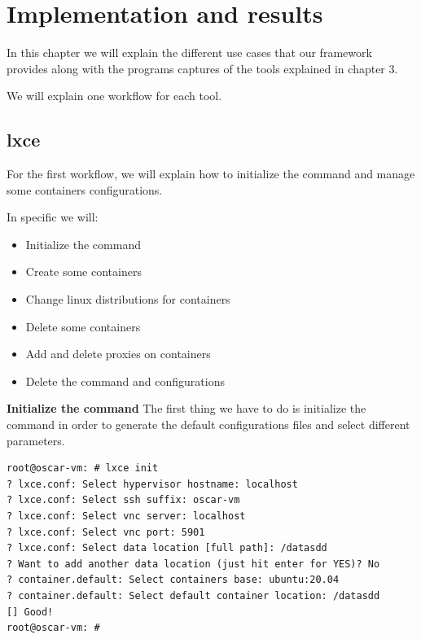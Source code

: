 \clearpage\section{Implementation and results}

In this chapter we will explain the different use cases that our framework provides along with the programs captures of the tools explained in chapter 3.

We will explain one workflow for each tool.

\subsection{lxce}
For the first workflow, we will explain how to initialize the command and manage some containers configurations.

In specific we will:
\begin{itemize}
	\item{Initialize the command}
	\item{Create some containers}
	\item{Change linux distributions for containers}
	\item{Delete some containers}
	\item{Add and delete proxies on containers}
	\item{Delete the command and configurations}
\end{itemize}

\textbf{Initialize the command}
The first thing we have to do is initialize the command in order to generate the default configurations files and select different parameters.

\begin{verbatim}
root@oscar-vm: # lxce init
? lxce.conf: Select hypervisor hostname: localhost
? lxce.conf: Select ssh suffix: oscar-vm
? lxce.conf: Select vnc server: localhost
? lxce.conf: Select vnc port: 5901
? lxce.conf: Select data location [full path]: /datasdd
? Want to add another data location (just hit enter for YES)? No
? container.default: Select containers base: ubuntu:20.04
? container.default: Select default container location: /datasdd
[] Good!
root@oscar-vm: #
\end{verbatim}

